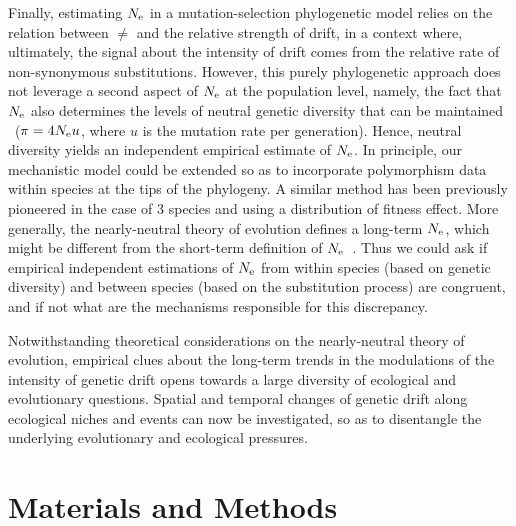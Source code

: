 Finally, estimating $N_{\text{e}}$ in a mutation-selection phylogenetic model relies on the relation between $\ne$ and the relative strength of drift, in a context where, ultimately, the signal about the intensity of drift comes from the relative rate of non-synonymous substitutions.
However, this purely phylogenetic approach does not leverage a second aspect of $N_{\text{e}}$ at the population level, namely, the fact that $N_{\text{e}}$ also determines the levels of neutral genetic diversity that can be maintained ~($\pi=4N_{\text{e}} u$, where $u$ is the mutation rate per generation).
Hence, neutral diversity yields an independent empirical estimate of $N_{\text{e}}$.
In principle, our mechanistic model could be extended so as to incorporate polymorphism data within species at the tips of the phylogeny.
A similar method has been previously pioneered in the case of 3 species and using a distribution of fitness effect\citep{Wilson2011}.
More generally, the nearly-neutral theory of evolution defines a long-term $N_{\text{e}}$, which might be different from the short-term definition of $N_{\text{e}}$~\citep{Platt2018}.
Thus we could ask if empirical independent estimations of $N_{\text{e}}$ from within species (based on genetic diversity) and between species (based on the substitution process) are congruent, and if not what are the mechanisms responsible for this discrepancy.

Notwithstanding theoretical considerations on the nearly-neutral theory of evolution, empirical clues about the long-term trends in the modulations of the intensity of genetic drift opens towards a large diversity of ecological and evolutionary questions.
Spatial and temporal changes of genetic drift along ecological niches and events can now be investigated, so as to disentangle the underlying evolutionary and ecological pressures.


\section{Materials and Methods}
\label{sec:MatMet}

